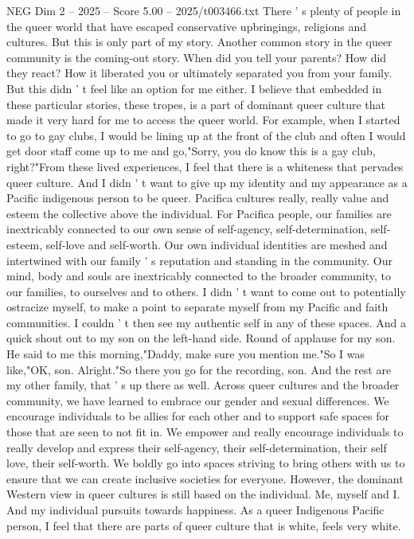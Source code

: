 \begin{textsample}{NEG Dim 2 – 2025 – Score 5.00 – 2025/t003466.txt}
There ' s plenty of people in the queer world that have escaped conservative upbringings, religions and cultures.
But this is only part of my story.
Another common story in the queer community is the coming-out story.
When did you tell your parents?
How did they react?
How it liberated you or ultimately separated you from your family.
But this didn ' t feel like an option for me either.
I believe that embedded in these particular stories, these tropes, is a part of dominant queer culture that made it very hard for me to access the queer world.
For example, when I started to go to gay clubs, I would be lining up at the front of the club and often I would get door staff come up to me and go,"Sorry, you do know this is a gay club, right?"From these lived experiences, I feel that there is a whiteness that pervades queer culture.
And I didn ' t want to give up my identity and my appearance as a Pacific indigenous person to be queer.
Pacifica cultures really, really value and esteem the collective above the individual.
For Pacifica people, our families are inextricably connected to our own sense of self-agency, self-determination, self-esteem, self-love and self-worth.
Our own individual identities are meshed and intertwined with our family ' s reputation and standing in the community.
Our mind, body and souls are inextricably connected to the broader community, to our families, to ourselves and to others.
I didn ' t want to come out to potentially ostracize myself, to make a point to separate myself from my Pacific and faith communities.
I couldn ' t then see my authentic self in any of these spaces.
And a quick shout out to my son on the left-hand side.
Round of applause for my son.
He said to me this morning,"Daddy, make sure you mention me."So I was like,"OK, son.
Alright."So there you go for the recording, son.
And the rest are my other family, that ' s up there as well.
Across queer cultures and the broader community, we have learned to embrace our gender and sexual differences.
We encourage individuals to be allies for each other and to support safe spaces for those that are seen to not fit in.
We empower and really encourage individuals to really develop and express their self-agency, their self-determination, their self love, their self-worth.
We boldly go into spaces striving to bring others with us to ensure that we can create inclusive societies for everyone.
However, the dominant Western view in queer cultures is still based on the individual.
Me, myself and I.
And my individual pursuits towards happiness.
As a queer Indigenous Pacific person, I feel that there are parts of queer culture that is white, feels very white.

\end{textsample}

